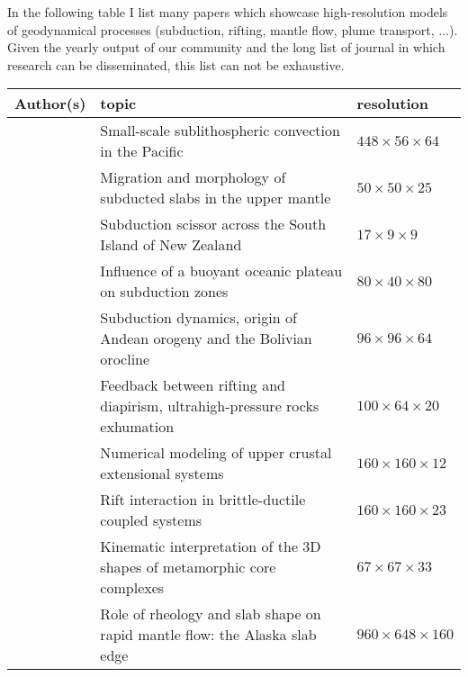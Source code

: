 
In the following table I list many papers which showcase high-resolution models of 
geodynamical processes (subduction, rifting, mantle flow, plume transport, ...).
Given the yearly output of our community and the long list of journal in which 
research can be disseminated, this list can not be exhaustive.

\begin{tabular}{lll}
\hline
Author(s)     & topic   & resolution \\
\hline
\hline
\cite{baih10} & Small-scale sublithospheric convection in the Pacific                           & $448\times56\times64$ \\ 
\cite{stsf10} & Migration and morphology of subducted slabs in the upper mantle                 & $50\times50\times25$ \\
\cite{pyeg10} & Subduction scissor across the South Island of New Zealand                       & $17\times9\times9$ \\
\cite{mamb10} & Influence of a buoyant oceanic plateau on subduction zones                      & $80\times 40 \times80$ \\%
\cite{cafz11} & Subduction dynamics, origin of Andean orogeny and the Bolivian orocline         & $96\times96\times64$ \\%
\cite{ellw11} & Feedback between rifting and diapirism, ultrahigh-pressure rocks exhumation     & $100\times64\times20$ \\%
\cite{alht11} & Numerical modeling of upper crustal extensional systems                         & $160\times160\times12$ \\%
\cite{alht12} & Rift interaction in brittle-ductile coupled systems                             & $160\times160\times23$ \\%
\cite{lehm12} & Kinematic interpretation of the 3D shapes of metamorphic core complexes         & $67\times67\times33$ \\%
\cite{jabi12} & Role of rheology and slab shape on rapid mantle flow: the Alaska slab edge      & $960\times648\times160$ \\%

\end{tabular}
